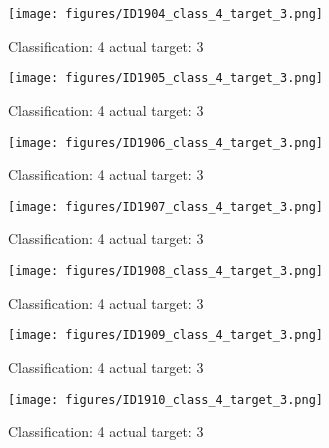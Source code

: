 \begin{figure}[h!]
\begin{center}
\texttt{[image: figures/ID1904\_class\_4\_target\_3.png]}
\end{center}
\caption{ Classification: 4 actual target: 3}
\label{fig:ID1904_class_4_target_3}
\end{figure}
\begin{figure}[h!]
\begin{center}
\texttt{[image: figures/ID1905\_class\_4\_target\_3.png]}
\end{center}
\caption{ Classification: 4 actual target: 3}
\label{fig:ID1905_class_4_target_3}
\end{figure}
\begin{figure}[h!]
\begin{center}
\texttt{[image: figures/ID1906\_class\_4\_target\_3.png]}
\end{center}
\caption{ Classification: 4 actual target: 3}
\label{fig:ID1906_class_4_target_3}
\end{figure}
\begin{figure}[h!]
\begin{center}
\texttt{[image: figures/ID1907\_class\_4\_target\_3.png]}
\end{center}
\caption{ Classification: 4 actual target: 3}
\label{fig:ID1907_class_4_target_3}
\end{figure}
\begin{figure}[h!]
\begin{center}
\texttt{[image: figures/ID1908\_class\_4\_target\_3.png]}
\end{center}
\caption{ Classification: 4 actual target: 3}
\label{fig:ID1908_class_4_target_3}
\end{figure}
\begin{figure}[h!]
\begin{center}
\texttt{[image: figures/ID1909\_class\_4\_target\_3.png]}
\end{center}
\caption{ Classification: 4 actual target: 3}
\label{fig:ID1909_class_4_target_3}
\end{figure}
\begin{figure}[h!]
\begin{center}
\texttt{[image: figures/ID1910\_class\_4\_target\_3.png]}
\end{center}
\caption{ Classification: 4 actual target: 3}
\label{fig:ID1910_class_4_target_3}
\end{figure}
